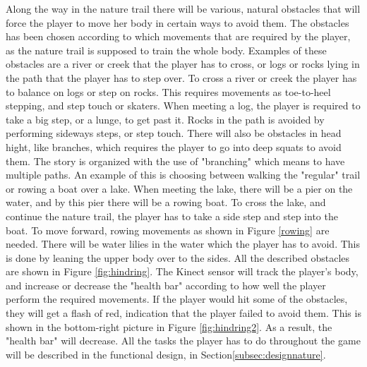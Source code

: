 Along the way in the nature trail there will be various, natural obstacles that will force the player to move her body in certain ways to avoid them. The obstacles has been chosen according to which movements that are required by the player, as the nature trail is supposed to train the whole body. Examples of these obstacles are a river or creek that the player has to cross, or logs or rocks lying in the path that the player has to step over. To cross a river or creek the player has to balance on logs or step on rocks. This requires movements as toe-to-heel stepping, and step touch or skaters. When meeting a log, the player is required to take a big step, or a lunge, to get past it. Rocks in the path is avoided by performing sideways steps, or step touch. There will also be obstacles in head hight, like branches, which requires the player to go into deep squats to avoid them. The story is organized with the use of "branching" which means to have multiple paths. An example of this is choosing between walking the "regular" trail or rowing a boat over a lake. When meeting the lake, there will be a pier on the water, and by this pier there will be a rowing boat. To cross the lake, and continue the nature trail, the player has to take a side step and step into the boat. To move forward, rowing movements as shown in Figure \ref{rowing} are needed. There will be water lilies in the water which the player has to avoid. This is done by leaning the upper body over to the sides. All the described obstacles are shown in Figure \ref{fig:hindring}. The Kinect sensor will track the player's body, and increase or decrease the "health bar" according to how well the player perform the required movements. If the player would hit some of the obstacles, they will get a flash of red, indication that the player failed to avoid them. This is shown in the bottom-right picture in Figure \ref{fig:hindring2}. As a result, the "health bar" will decrease. All the tasks the player has to do throughout the game will be described in the functional design, in Section\ref{subsec:designnature}.

